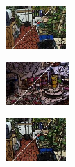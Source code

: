 \begin{figure}
\begin{subfigure}[b]{0.1375\textwidth}
	\end{subfigure}
	\begin{subfigure}[b]{0.129\textwidth}
		\includegraphics[height=1.65cm]{pictures/sunrgbd/wp/cropped/wp_00004732_contours}
	\end{subfigure}
	\begin{subfigure}[b]{0.02\textwidth}
	\end{subfigure}
	\begin{subfigure}[b]{0.1375\textwidth}
		\includegraphics[height=1.65cm]{pictures/nyuv2/etps/cropped/etps_00000561_contours}
	\end{subfigure}
	\begin{subfigure}[b]{0.129\textwidth}
		\includegraphics[height=1.65cm]{pictures/sunrgbd/etps/cropped/etps_00004732_contours}
	\end{subfigure}
	\begin{subfigure}[b]{0.02\textwidth}
	\end{subfigure}

\end{figure}
